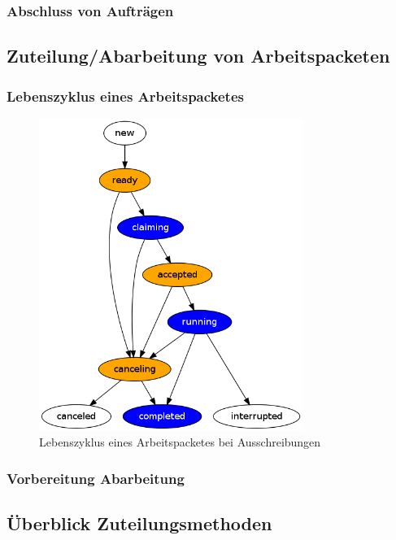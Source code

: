 \subsubsection{Abschluss von Auftr\"agen}


\subsection{Zuteilung/Abarbeitung von Arbeitspacketen}


\subsubsection{Lebenszyklus eines Arbeitspacketes}


\begin{figure}[ht] 
  \label{fig:lebenszyklus-arbeitspaket}
  \begin{center}
      \includegraphics[height=4in]{imageinput/lebenszyklus-arbeitspaket.png}
  \end{center}
  \caption{Lebenszyklus eines Arbeitspacketes bei Ausschreibungen}
\end{figure}


\subsubsection{Vorbereitung Abarbeitung}

\subsection{\"Uberblick Zuteilungsmethoden}


